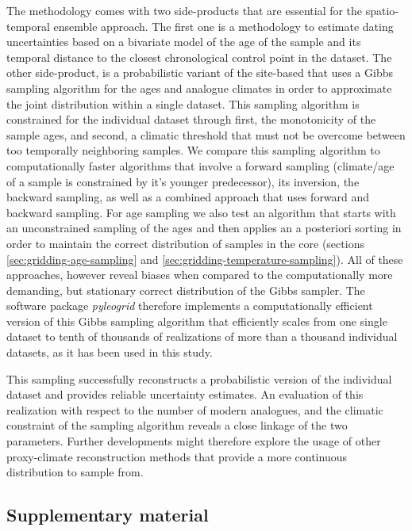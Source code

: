 \begin{refsection}
The methodology comes with two side-products that are essential for the spatio-temporal ensemble approach. The first one is a methodology to estimate dating uncertainties based on a bivariate model of the age of the sample and its temporal distance to the closest chronological control point in the dataset. The other side-product, is a probabilistic variant of the site-based  that uses a Gibbs sampling algorithm for the ages and analogue climates in order to approximate the joint distribution within a single dataset. This sampling algorithm is constrained for the individual dataset through first, the monotonicity of the sample ages, and second, a climatic threshold that must not be overcome between too temporally neighboring samples. We compare this sampling algorithm to computationally faster algorithms that involve a forward sampling (climate/age of a sample is constrained by it's younger predecessor), its inversion, the backward sampling, as well as a combined approach that uses forward and backward sampling. For age sampling we also test an algorithm that starts with an unconstrained sampling of the ages and then applies an a posteriori sorting in order to maintain the correct distribution of samples in the core (sections \ref{sec:gridding-age-sampling} and \ref{sec:gridding-temperature-sampling}). All of these approaches, however reveal biases when compared to the computationally more demanding, but stationary correct distribution of the Gibbs sampler. The software package \textit{pyleogrid} therefore implements a computationally efficient version of this Gibbs sampling algorithm that efficiently scales from one single dataset to tenth of thousands of realizations of more than a thousand individual datasets, as it has been used in this study.

This sampling successfully reconstructs a probabilistic version of the individual dataset and provides reliable uncertainty estimates. An evaluation of this realization with respect to the number of modern analogues, and the climatic constraint of the sampling algorithm reveals a close linkage of the two parameters. Further developments might therefore explore the usage of other proxy-climate reconstruction methods that provide a more continuous distribution to sample from.

\clearpage

\begin{subappendices}
	\section*{Supplementary material}
	

\end{subappendices}
\end{refsection}
